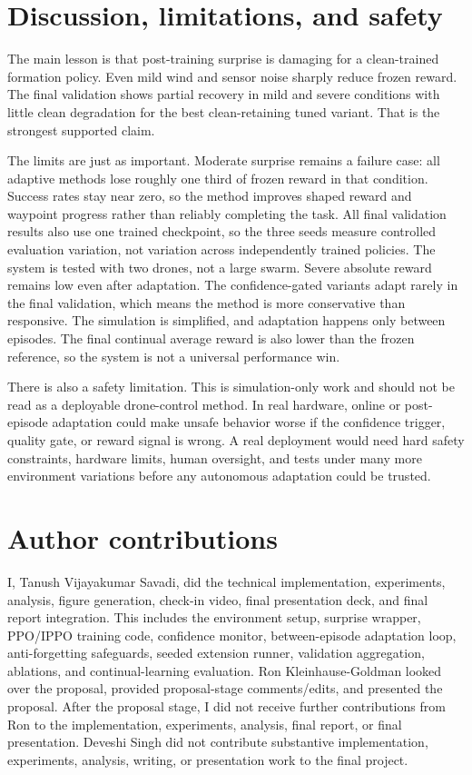 \documentclass{article}
\begin{document}
\section{Discussion, limitations, and safety}

The main lesson is that post-training surprise is damaging for a clean-trained formation policy. Even mild wind and sensor noise sharply reduce frozen reward. The final validation shows partial recovery in mild and severe conditions with little clean degradation for the best clean-retaining tuned variant. That is the strongest supported claim.

The limits are just as important. Moderate surprise remains a failure case: all adaptive methods lose roughly one third of frozen reward in that condition. Success rates stay near zero, so the method improves shaped reward and waypoint progress rather than reliably completing the task. All final validation results also use one trained checkpoint, so the three seeds measure controlled evaluation variation, not variation across independently trained policies. The system is tested with two drones, not a large swarm. Severe absolute reward remains low even after adaptation. The confidence-gated variants adapt rarely in the final validation, which means the method is more conservative than responsive. The simulation is simplified, and adaptation happens only between episodes. The final continual average reward is also lower than the frozen reference, so the system is not a universal performance win.

There is also a safety limitation. This is simulation-only work and should not be read as a deployable drone-control method. In real hardware, online or post-episode adaptation could make unsafe behavior worse if the confidence trigger, quality gate, or reward signal is wrong. A real deployment would need hard safety constraints, hardware limits, human oversight, and tests under many more environment variations before any autonomous adaptation could be trusted.

\section{Author contributions}

I, Tanush Vijayakumar Savadi, did the technical implementation, experiments, analysis, figure generation, check-in video, final presentation deck, and final report integration. This includes the environment setup, surprise wrapper, PPO/IPPO training code, confidence monitor, between-episode adaptation loop, anti-forgetting safeguards, seeded extension runner, validation aggregation, ablations, and continual-learning evaluation. Ron Kleinhause-Goldman looked over the proposal, provided proposal-stage comments/edits, and presented the proposal. After the proposal stage, I did not receive further contributions from Ron to the implementation, experiments, analysis, final report, or final presentation. Deveshi Singh did not contribute substantive implementation, experiments, analysis, writing, or presentation work to the final project.
\end{document}
